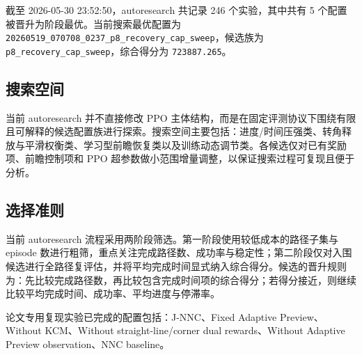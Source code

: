 截至 2026-05-30 23:52:50，autoresearch 共记录 246 个实验，其中共有 5 个配置被晋升为阶段最优。当前搜索最优配置为 \texttt{20260519\_070708\_0237\_p8\_recovery\_cap\_sweep}，候选族为 \texttt{p8\_recovery\_cap\_sweep}，综合得分为 \texttt{723887.265}。

\subsection{搜索空间}
当前 autoresearch 并不直接修改 PPO 主体结构，而是在固定评测协议下围绕有限且可解释的候选配置族进行探索。搜索空间主要包括：进度/时间压强类、转角释放与平滑权衡类、学习型前瞻恢复类以及训练动态调节类。各候选仅对已有奖励项、前瞻控制项和 PPO 超参数做小范围增量调整，以保证搜索过程可复现且便于分析。

\subsection{选择准则}
当前 autoresearch 流程采用两阶段筛选。第一阶段使用较低成本的路径子集与 episode 数进行粗筛，重点关注完成路径数、成功率与稳定性；第二阶段仅对入围候选进行全路径复评估，并将平均完成时间显式纳入综合得分。候选的晋升规则为：先比较完成路径数，再比较包含完成时间项的综合得分；若得分接近，则继续比较平均完成时间、成功率、平均进度与停滞率。

论文专用复现实验已完成的配置包括：J-NNC、Fixed Adaptive Preview、Without KCM、Without straight-line/corner dual rewards、Without Adaptive Preview observation、NNC baseline。
